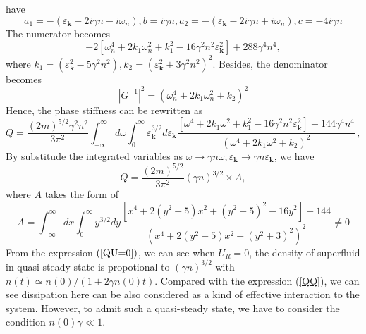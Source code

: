\documentclass{article}
\newcommand{\tmmathbf}[1]{\ensuremath{\boldsymbol{#1}}}
\begin{document}
have
\begin{equation}
  a_1 = - (\varepsilon_{\tmmathbf{k}} - 2 i \gamma n - i \omega_n), b = i
  \gamma n, a_2 = - (\varepsilon_{\tmmathbf{k}} - 2 i \gamma n + i \omega_n),
  c = - 4 i \gamma n
\end{equation}
The numerator becomes
\begin{equation}
  - 2 [\omega_n^4 + 2 k_1 \omega_n^2 + k_1^2 - 16 \gamma^2 n^2
  \varepsilon^2_{\tmmathbf{k}}] + 288 \gamma^4 n^4,
\end{equation}
where $k_1 = (\varepsilon^2_{\tmmathbf{k}} - 5 \gamma^2 n^2), k_2 =
(\varepsilon^2_{\tmmathbf{k}} + 3 \gamma^2 n^2)^2$. Besides, the denominator
becomes
\begin{equation}
  | G^{- 1} |^2 = (\omega_n^4 + 2 k_1 \omega_n^2 + k_2)^2
\end{equation}
Hence, the phase stiffness can be rewritten as
\begin{equation}
  Q = \frac{(2 m)^{5 / 2} \gamma^2 n^2}{3 \pi^2} \int_{- \infty}^{\infty} d
  \omega \int_0^{\infty} \varepsilon_{\tmmathbf{k}}^{3 / 2} d
  \varepsilon_{\tmmathbf{k}} \frac{[\omega^4 + 2 k_1 \omega^2 + k_1^2 - 16
  \gamma^2 n^2 \varepsilon^2_{\tmmathbf{k}}] - 144 \gamma^4 n^4}{(\omega^4 + 2
  k_1 \omega^2 + k_2)^2} \,,
\end{equation}
By substitude the integrated variables as $\omega \rightarrow \gamma n \omega,
\varepsilon_{\tmmathbf{k}} \rightarrow \gamma n \varepsilon_{\tmmathbf{k}}$,
we have
\begin{equation}
  Q = \frac{(2 m)^{5 / 2}}{3 \pi^2} (\gamma n)^{3 / 2} \times A, \label{QU=0}
\end{equation}
where $A$ takes the form of
\begin{equation}
  A = \int_{- \infty}^{\infty} d x \int_0^{\infty} y^{3 / 2} d y \frac{[x^4 +
  2 (y^2 - 5) x^2 + (y^2 - 5)^2 - 16 y^2] - 144}{(x^4 + 2 (y^2 - 5) x^2 + (y^2
  + 3)^2)^2} \neq 0
\end{equation}
From the expression $\left( \ref{QU=0} \right)$, we can see when $U_R = 0$,
the density of superfluid in quasi-steady state is propotional to $(\gamma
n)^{3 / 2}$ with $n (t) \simeq n (0) / (1 + 2 \gamma n (0) t)$. Compared with
the expression (\ref{QQ}), we can see dissipation here can be also considered
as a kind of effective interaction to the system. However, to admit such a
quasi-steady state, we have to consider the condition $n (0) \gamma \ll 1$.
\end{document}
